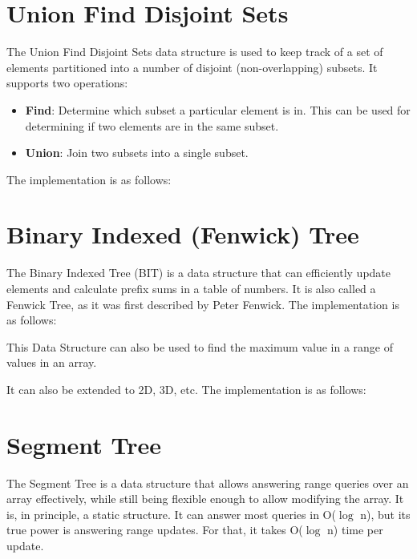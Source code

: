 \section{Union Find Disjoint Sets}

The Union Find Disjoint Sets data structure is used to keep track of a set of elements partitioned into a number of disjoint (non-overlapping) subsets. It supports two operations:

\begin{itemize}
\item \textbf{Find}: Determine which subset a particular element is in. This can be used for determining if two elements are in the same subset.
\item \textbf{Union}: Join two subsets into a single subset.
\end{itemize}

The implementation is as follows:



\section{Binary Indexed (Fenwick) Tree}

The Binary Indexed Tree (BIT) is a data structure that can efficiently update elements and calculate prefix sums in a table of numbers. It is also called a Fenwick Tree, as it was first described by Peter Fenwick. The implementation is as follows:



This Data Structure can also be used to find the maximum value in a range of values in an array.

It can also be extended to 2D, 3D, etc. The implementation is as follows:



\section{Segment Tree}

The Segment Tree is a data structure that allows answering range queries over an array effectively, while still being flexible enough to allow modifying the array. It is, in principle, a static structure. It can answer most queries in O($\log$ n), but its true power is answering range updates. For that, it takes O($\log$ n) time per update.

